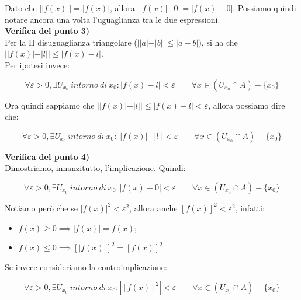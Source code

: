 \documentclass{article}
\begin{document}
\noindent Dato che $||f(x)|| = |f(x)|$, allora $||f(x)| - 0| = |f(x) - 0|$. Possiamo quindi notare ancora una volta l'uguaglianza tra le due espressioni.\\

\noindent\textbf{Verifica del punto 3)}\\
Per la II disuguaglianza triangolare ($||a| - |b|| \leq |a - b|$), si ha che $||f(x)| - |l|| \leq |f(x) - l|$. \\
Per ipotesi invece: 

\begin{equation*}
    \forall \varepsilon > 0, \exists U_{x_0} \ intorno \ di \ x_0 : |f(x) - l| < \varepsilon \qquad \forall x \in (U_{x_0} \cap A) - \{x_0\}
\end{equation*}

\noindent Ora quindi sappiamo che $||f(x)| - |l|| \leq |f(x) - l| < \varepsilon$, allora possiamo dire che:

\begin{equation*}
    \forall \varepsilon > 0, \exists U_{x_0} \ intorno \ di \ x_0 : ||f(x)| - |l|| < \varepsilon \qquad \forall x \in (U_{x_0} \cap A) - \{x_0\}
\end{equation*}

\noindent\textbf{Verifica del punto 4)}\\
\noindent Dimostriamo, innanzitutto, l'implicazione. Quindi:

\begin{equation*}
    \forall \varepsilon > 0, \exists U_{x_0} \ intorno \ di \ x_0 : |f(x) - 0| < \varepsilon \qquad \forall x \in (U_{x_0} \cap A) - \{x_0\}
\end{equation*}

\noindent Notiamo però che se $|f(x)|^2 < \varepsilon^2$, allora anche $[f(x)]^2 < \varepsilon^2$, infatti:

\begin{itemize}
    \item $f(x) \geq 0 \implies |f(x)| = f(x)$;
    \item $f(x) \leq 0 \implies [|f(x)|]^2 = [f(x)]^2$
\end{itemize}

\noindent Se invece consideriamo la controimplicazione:

\begin{equation*}
    \forall \varepsilon > 0, \exists U_{x_0} \ intorno \ di \ x_0 : |[f(x)]^2| < \varepsilon \qquad \forall x \in (U_{x_0} \cap A) - \{x_0\}
\end{equation*}
\end{document}
